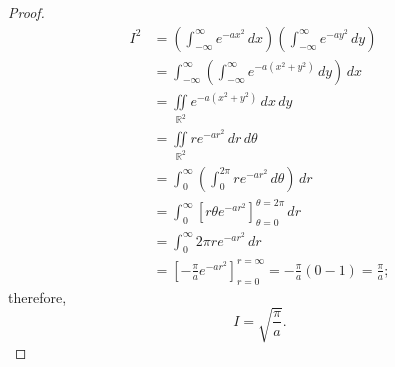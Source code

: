 \begin{proof}
    \begin{align*}
        I^2 &= \left( \int_{-\infty}^{\infty} e^{-a x^2} \, dx \right) \left( \int_{-\infty}^{\infty} e^{-a y^2} \, dy \right) \\
        &= \int_{-\infty}^{\infty} \left( \int_{-\infty}^{\infty} e^{-a (x^2 + y^2)} \, dy \right) \, dx \\
        &= \iint\limits_{\mathbb{R}^2} e^{-a (x^2 + y^2)} \, dx \, dy \\
        &= \iint\limits_{\mathbb{R}^2} r e^{-a r^2} \, dr \, d\theta \\
        &= \int_{0}^{\infty} \left( \int_{0}^{2 \pi} r e^{-a r^2} \, d\theta \right) \, dr \\
        &= \int_{0}^{\infty} \left[ r \theta e^{-a r^2} \right]^{\theta = 2 \pi}_{\theta = 0} \, dr \\
        &= \int_{0}^{\infty} 2 \pi r e^{-a r^2} \, dr \\
        &= \left[ -\frac{\pi}{a} e^{-a r^2} \right]^{r = \infty}_{r = 0} = -\frac{\pi}{a}(0 - 1) = \frac{\pi}{a};
    \end{align*}
    therefore, \[ I = \sqrt{\frac{\pi}{a}}. \]
\end{proof}
